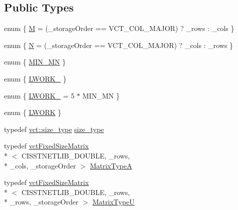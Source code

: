 \subsection*{Public Types}
\begin{DoxyCompactItemize}
\item 
enum \{ \hyperlink{classnmr_s_v_d_fixed_size_data_afde2fde1248ef26d1678126978dff95eac4be81b1cc6f6d12232a22300cc4c180}{M} = (\-\_\-storage\-Order == V\-C\-T\-\_\-\-C\-O\-L\-\_\-\-M\-A\-J\-O\-R) ? \-\_\-rows \-: \-\_\-cols
 \}
\item 
enum \{ \hyperlink{classnmr_s_v_d_fixed_size_data_acd97aa1b3e1cc59cd68d90ae12060134a017d2b71061eea6ea68ce5346c3bc89c}{N} = (\-\_\-storage\-Order == V\-C\-T\-\_\-\-C\-O\-L\-\_\-\-M\-A\-J\-O\-R) ? \-\_\-cols \-: \-\_\-rows
 \}
\item 
enum \{ \hyperlink{classnmr_s_v_d_fixed_size_data_a2ef10a687cdcc36a623139f9f2aa6301aded94c86f27589c19e93b3c9931b323f}{M\-I\-N\-\_\-\-M\-N}
 \}
\item 
enum \{ \hyperlink{classnmr_s_v_d_fixed_size_data_a1f7c9e7b1fb9ce61a77b03762210bee7aa0970ece312e239b3094526a92387112}{L\-W\-O\-R\-K\-\_}
 \}
\item 
enum \{ \hyperlink{classnmr_s_v_d_fixed_size_data_aed2ddaee24398b6c38f9a8e633789353a29617ad7307631121dd67ae7b5f7a4b9}{L\-W\-O\-R\-K\-\_} = 5 $\ast$ M\-I\-N\-\_\-\-M\-N
 \}
\item 
enum \{ \hyperlink{classnmr_s_v_d_fixed_size_data_ab47ccf635561f3a974f32ccac2a18aefad2d7db4b5640d7d880013bf89de1b1f8}{L\-W\-O\-R\-K}
 \}
\item 
typedef \hyperlink{namespacevct_a3e2935e13aac4500965e00d30565775b}{vct\-::size\-\_\-type} \hyperlink{classnmr_s_v_d_fixed_size_data_a2622c8b24534929513816ff92ac83216}{size\-\_\-type}
\item 
typedef \hyperlink{classvct_fixed_size_matrix}{vct\-Fixed\-Size\-Matrix}\\*
$<$ C\-I\-S\-S\-T\-N\-E\-T\-L\-I\-B\-\_\-\-D\-O\-U\-B\-L\-E, \-\_\-rows, \\*
\-\_\-cols, \-\_\-storage\-Order $>$ \hyperlink{classnmr_s_v_d_fixed_size_data_a86798e3079d3215e1ded8d48d914c45c}{Matrix\-Type\-A}
\item 
typedef \hyperlink{classvct_fixed_size_matrix}{vct\-Fixed\-Size\-Matrix}\\*
$<$ C\-I\-S\-S\-T\-N\-E\-T\-L\-I\-B\-\_\-\-D\-O\-U\-B\-L\-E, \-\_\-rows, \\*
\-\_\-rows, \-\_\-storage\-Order $>$ \hyperlink{classnmr_s_v_d_fixed_size_data_a164bbc8eccf8b1102d5a85dde45de99d}{Matrix\-Type\-U}

\end{DoxyCompactItemize}
